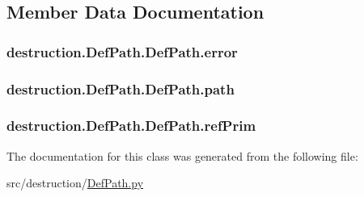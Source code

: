 \subsection{Member Data Documentation}
\hypertarget{classdestruction_1_1_def_path_1_1_def_path_a373d47f935ba8d9e35430b9031a7f283}{
\subsubsection[{error}]{\setlength{\rightskip}{0pt plus 5cm}destruction.\-Def\-Path.\-Def\-Path.\-error}}\label{classdestruction_1_1_def_path_1_1_def_path_a373d47f935ba8d9e35430b9031a7f283}
\hypertarget{classdestruction_1_1_def_path_1_1_def_path_a97cac00ba114927444ae72be21272817}{
\subsubsection[{path}]{\setlength{\rightskip}{0pt plus 5cm}destruction.\-Def\-Path.\-Def\-Path.\-path}}\label{classdestruction_1_1_def_path_1_1_def_path_a97cac00ba114927444ae72be21272817}
\hypertarget{classdestruction_1_1_def_path_1_1_def_path_aa289b1ff27bc715710713f5981122d70}{
\subsubsection[{ref\-Prim}]{\setlength{\rightskip}{0pt plus 5cm}destruction.\-Def\-Path.\-Def\-Path.\-ref\-Prim}}\label{classdestruction_1_1_def_path_1_1_def_path_aa289b1ff27bc715710713f5981122d70}


The documentation for this class was generated from the following file\-:\begin{DoxyCompactItemize}
\item 
src/destruction/\hyperlink{_def_path_8py}{Def\-Path.\-py}\end{DoxyCompactItemize}
